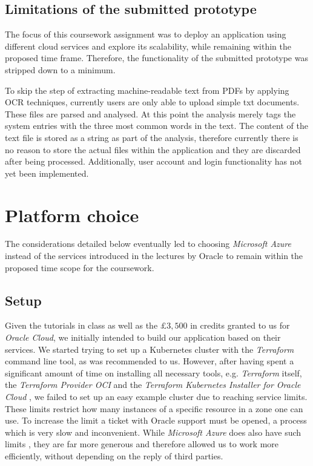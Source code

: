 \documentclass[conference]{IEEEtran}
\begin{document}
\subsection{Limitations of the submitted prototype}
\label{subsec:limits}
The focus of this coursework assignment was to deploy an application using different cloud services and explore its scalability, while remaining within the proposed time frame. Therefore, the functionality of the submitted prototype was stripped down to a minimum.

To skip the step of extracting machine-readable text from PDFs by applying OCR techniques, currently users are only able to upload simple txt documents. These files are parsed and analysed. At this point the analysis merely tags the system entries with the three most common words in the text. The content of the text file is stored as a string as part of the analysis, therefore currently there is no reason to store the actual files within the application and they are discarded after being processed. Additionally, user account and login functionality has not yet been implemented.

\section{Platform choice}
\label{sec:platform-choice}
The considerations detailed below eventually led to choosing \textit{Microsoft Azure} instead of the services introduced in the lectures by Oracle to remain within the proposed time scope for the coursework.

\subsection{Setup}
\label{subsec:setup}
Given the tutorials in class as well as the $\pounds 3,500$ in credits granted to us for \textit{Oracle Cloud}, we initially intended to build our application based on their services. We started trying to set up a Kubernetes cluster with the \textit{Terraform} \cite{Terraform} command line tool, as was recommended to us. However, after having spent a significant amount of time on installing all necessary tools, e.g. \textit{Terraform} itself, the \textit{Terraform Provider OCI}\cite{TerraformProviderOCI} and the \textit{Terraform Kubernetes Installer for Oracle Cloud} \cite{TerrafromK8sInstaller}, we failed to set up an easy example cluster due to reaching service limits. These limits restrict how many instances of a specific resource in a zone one can use. To increase the limit a ticket with Oracle support must be opened, a process which is very slow and inconvenient. While \textit{Microsoft Azure} does also have such limits \cite{AzureLimits}, they are far more generous and therefore allowed us to work more efficiently, without depending on the reply of third parties.
\end{document}
